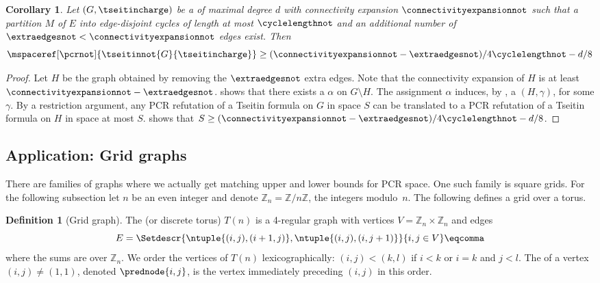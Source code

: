 \documentclass[11pt]{article}
\numberwithin{equation}{section}
\newtheorem{corollary}[theorem]{Corollary}
\theoremstyle{definition}
\newtheorem{definition}[theorem]{Definition}
\theoremstyle{plain}
\begin{document}
\begin{corollary} \label{cor:tseitin-small-cycles-space-lower-bound}
  Let $(G,\tseitincharge)$ be a \Gnonsplitting \chargedgraph of maximal degree $d$ with connectivity expansion $\connectivityexpansionnot$ such that a partition $M$ of $E$ into edge-disjoint cycles of length at most $\cyclelengthnot$ and an additional number of $\extraedgesnot < \connectivityexpansionnot$ edges exist. Then
  \begin{equation*}
    \mspaceref[\pcrnot]{\tseitinnot{G}{\tseitincharge}}\geq (\connectivityexpansionnot-\extraedgesnot)/4\cyclelengthnot -d/8
  \end{equation*}
\end{corollary}
\begin{proof}
  Let $H$ be the graph obtained by removing the $\extraedgesnot$ extra
  edges. Note that the connectivity expansion of $H$ is at least
  $\connectivityexpansionnot-\extraedgesnot$.
  shows that there exists
  a \nonsplittingassignment $\alpha$ on $G \setminus H$.
  The assignment $\alpha$ induces, by
 , a \Gnonsplitting
  \chargedgraph $(H,\gamma)$, for some $\gamma$.
  By a restriction argument, any PCR refutation of a \Gnonsplitting
  Tseitin formula on $G$ in space $S$ can be translated to a PCR
  refutation of a \Gnonsplitting Tseitin formula on $H$ in space at
  most $S$.  shows
  that
  $S \geq (\connectivityexpansionnot-\extraedgesnot)/4\cyclelengthnot
  -d/8$.
\end{proof}

\subsection{Application: Grid graphs} \label{sec:grids}

There are families of graphs where we actually get matching upper and lower bounds for PCR space. One such family is square grids. For the following subsection let $n$ be an even integer and denote $\mathbb{Z}_n=\mathbb{Z}/n\mathbb{Z}$, the integers modulo~$n$. The following defines a grid over a torus.

\begin{definition}[Grid graph]
  \label{def:grid-graph}
  The  (or discrete torus) $T(n)$ is a 4-regular graph with vertices $V=\mathbb{Z}_n\times\mathbb{Z}_n$ and edges
  \begin{equation*}
    E=\Setdescr{\ntuple{(i,j),(i+1,j)},\ntuple{(i,j),(i,j+1)}}{i,j\in V}\eqcomma
  \end{equation*}
  where the sums are over $\mathbb{Z}_n$.
  We order the vertices of $T(n)$ lexicographically: $(i,j) < (k,l)$ if $i<k$ or $i=k$ and $j<l$. The  of a vertex $(i,j) \neq (1,1)$, denoted $\prednode{i,j}$, is the vertex immediately preceding $(i,j)$ in this order.
\end{definition}
\end{document}
